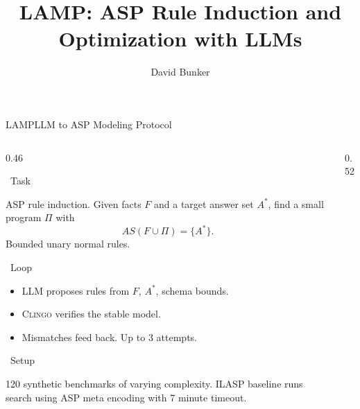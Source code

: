 \documentclass[aspectratio=169,10pt]{beamer}
\title{LAMP: ASP Rule Induction and Optimization with LLMs}
\author{David Bunker}
\institute{University of Potsdam}
\date{}
\newcommand{\sectionhead}[1]{%
  \vspace{2pt}%
  \colorbox{potsdamblue}{\color{white}\bfseries\strut~#1~}%
  \par\vspace{2pt}%
}
\begin{document}
\begin{frame}{LAMP\quad LLM to ASP Modeling Protocol}

\begin{columns}[T,onlytextwidth]

\begin{column}{0.46\textwidth}

\sectionhead{Task}
\footnotesize
ASP rule induction. Given facts $F$ and a target answer set $A^*$, find a small program $\Pi$ with
\[
  AS(F \cup \Pi) = \{A^*\}.
\]
Bounded unary normal rules.

\vspace{0.15cm}
\sectionhead{Loop}
\footnotesize
\begin{itemize}\itemsep1pt
  \item LLM proposes rules from $F$, $A^*$, schema bounds.
  \item \textsc{Clingo} verifies the stable model.
  \item Mismatches feed back. Up to 3 attempts.
\end{itemize}

\vspace{0.15cm}
\sectionhead{Setup}
\footnotesize
120 synthetic benchmarks of varying complexity. ILASP baseline runs search using ASP meta encoding with 7 minute timeout.

\end{column}

\begin{column}{0.52\textwidth}


\end{column}
\end{columns}
\end{frame}
\end{document}
